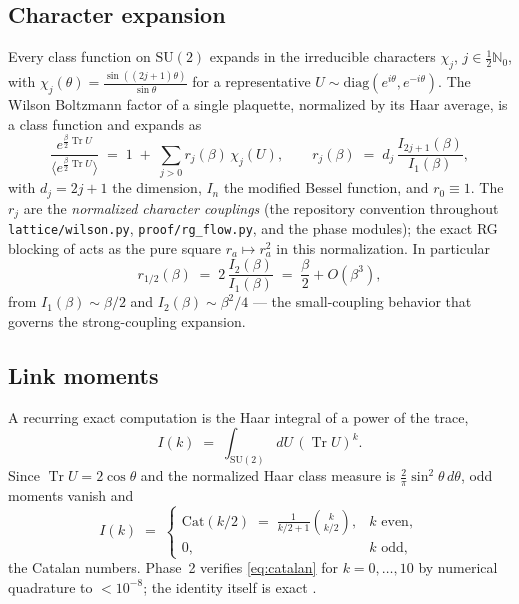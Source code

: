 \documentclass[11pt,a4paper]{article}
\newcommand{\SU}{\mathrm{SU}}
\newcommand{\N}{\mathbb{N}}
\newcommand{\Tr}{\operatorname{Tr}}
\begin{document}
\subsection{Character expansion}
\label{sec:charexp}

Every class function on $\SU(2)$ expands in the irreducible characters
$\chi_j$, $j \in \tfrac12 \N_0$, with $\chi_j(\theta) =
\frac{\sin((2j+1)\theta)}{\sin\theta}$ for a representative
$U \sim \mathrm{diag}(e^{i\theta}, e^{-i\theta})$.  The Wilson Boltzmann
factor of a single plaquette, normalized by its Haar average, is a class
function and expands as
\begin{equation}
  \frac{e^{\frac{\beta}{2}\Tr U}}{\bigl\langle e^{\frac{\beta}{2}\Tr U}
  \bigr\rangle}
  \;=\; 1 \;+\; \sum_{j > 0} r_j(\beta)\, \chi_j(U),
  \qquad
  r_j(\beta) \;=\; d_j \,\frac{I_{2j+1}(\beta)}{I_1(\beta)},
  \label{eq:charexp}
\end{equation}
with $d_j = 2j + 1$ the dimension, $I_n$ the modified Bessel function, and
$r_0 \equiv 1$.  The $r_j$ are the \emph{normalized character couplings}
(the repository convention throughout
\texttt{lattice/wilson.py}, \texttt{proof/rg\_flow.py}, and the phase
modules); the exact RG blocking of  acts as the pure
square $r_a \mapsto r_a^2$ in this normalization.  In particular
\begin{equation}
  r_{1/2}(\beta) \;=\; 2\,\frac{I_2(\beta)}{I_1(\beta)}
  \;=\; \frac{\beta}{2} + O(\beta^3),
  \label{eq:rsmall}
\end{equation}
from $I_1(\beta) \sim \beta/2$ and $I_2(\beta) \sim \beta^2/4$ --- the
small-coupling behavior that governs the strong-coupling expansion.

\subsection{Link moments}
\label{sec:moments}

A recurring exact computation is the Haar integral of a power of the trace,
\begin{equation}
  I(k) \;=\; \int_{\SU(2)} dU\, (\Tr U)^k .
  \label{eq:moments}
\end{equation}
Since $\Tr U = 2\cos\theta$ and the normalized Haar class measure is
$\frac{2}{\pi}\sin^2\theta \, d\theta$, odd moments vanish and
\begin{equation}
  I(k) \;=\;
  \begin{cases}
    \mathrm{Cat}(k/2) \;=\; \frac{1}{k/2 + 1}\binom{k}{k/2}, & k \text{ even},\\
    0, & k \text{ odd},
  \end{cases}
  \label{eq:catalan}
\end{equation}
the Catalan numbers.  Phase~2 verifies \cref{eq:catalan} for $k = 0,\dots,10$
by numerical quadrature to $< 10^{-8}$; the identity itself is exact
\cite{wigner}.
\end{document}

